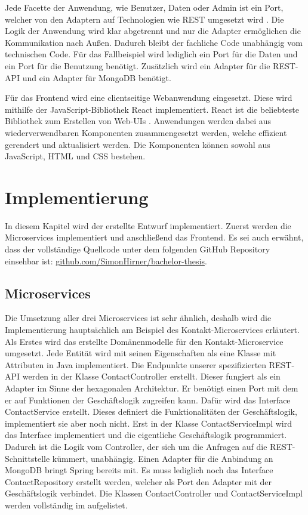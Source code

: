 Jede Facette der Anwendung, wie Benutzer, Daten oder Admin ist ein Port, welcher von den Adaptern auf Technologien wie REST umgesetzt wird \parencite[vgl.][S. 204]{wolffMicroservices2018}. Die Logik der Anwendung wird klar abgetrennt und nur die Adapter ermöglichen die Kommunikation nach Außen. Dadurch bleibt der fachliche Code unabhängig vom technischen Code. Für das Fallbeispiel wird lediglich ein Port für die Daten und ein Port für die Benutzung benötigt. Zusätzlich wird ein Adapter für die \ac{REST}-\ac{API} und ein Adapter für MongoDB benötigt.

Für das Frontend wird eine clientseitige Webanwendung eingesetzt. Diese wird mithilfe der JavaScript-Bibliothek React implementiert. React ist die beliebteste Bibliothek zum Erstellen von Web-\acp{UI} \parencite[vgl.][]{stackoverflowMost2021}. Anwendungen werden dabei aus wiederverwendbaren Komponenten zusammengesetzt werden, welche effizient gerendert und aktualisiert werden. Die Komponenten können sowohl aus JavaScript, \ac{HTML} und \ac{CSS} bestehen. 

\clearpage
\section{Implementierung}
In diesem Kapitel wird der erstellte Entwurf implementiert. Zuerst werden die Microservices implementiert und anschließend das Frontend. Es sei auch erwähnt, dass der vollständige Quellcode unter dem folgenden GitHub Repository einsehbar ist: \href{https://github.com/SimonHirner/bachelor-thesis}{github.com/SimonHirner/bachelor-thesis}.

\subsection{Microservices}
Die Umsetzung aller drei Microservices ist sehr ähnlich, deshalb wird die Implementierung hauptsächlich am Beispiel des Kontakt-Microservices erläutert. Als Erstes wird das erstellte Domänenmodelle für den Kontakt-Microservice umgesetzt. Jede Entität wird mit seinen Eigenschaften als eine Klasse mit Attributen in Java implementiert. Die Endpunkte unserer spezifizierten REST-API werden in der Klasse ContactController erstellt. Dieser fungiert als ein Adapter im Sinne der hexagonalen Architektur. Er benötigt einen Port mit dem er auf Funktionen der Geschäftslogik zugreifen kann. Dafür wird das Interface ContactService erstellt. Dieses definiert die Funktionalitäten der Geschäftslogik, implementiert sie aber noch nicht. Erst in der Klasse ContactServiceImpl wird das Interface implementiert und die eigentliche Geschäftslogik programmiert. Dadurch ist die Logik vom Controller, der sich um die Anfragen auf die REST-Schnittstelle kümmert, unabhängig. Einen Adapter für die Anbindung an MongoDB bringt Spring bereits mit. Es muss lediglich noch das Interface ContactRepository erstellt werden, welcher als Port den Adapter mit der Geschäftslogik verbindet. Die Klassen ContactController und ContactServiceImpl werden vollständig im  aufgelistet.

